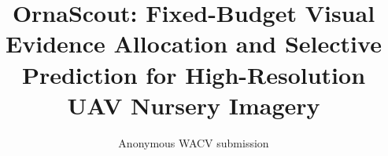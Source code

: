 \documentclass[10pt,twocolumn,letterpaper]{article}
\title{OrnaScout: Fixed-Budget Visual Evidence Allocation and Selective\\
Prediction for High-Resolution UAV Nursery Imagery}
\author{Anonymous WACV submission}
\begin{document}
\maketitle








\FloatBarrier
{\small


}
\end{document}
